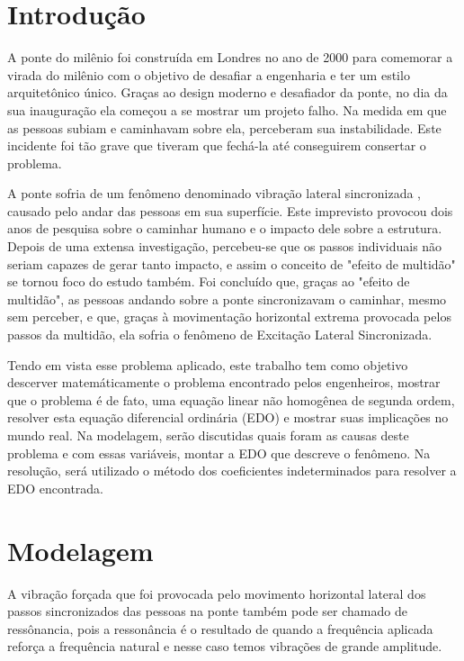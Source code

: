 \documentclass[12pt]{article}
\begin{document}
\section{Introdução}

A ponte do milênio foi construída em Londres no ano de 2000 para comemorar
a virada do milênio com o objetivo de desafiar a engenharia e ter um estilo arquitetônico único.
Graças ao design moderno e desafiador da ponte, no dia da sua inauguração ela começou a se mostrar um projeto falho.
Na medida em que as pessoas subiam e caminhavam sobre ela, perceberam sua instabilidade.
Este incidente foi tão grave que tiveram que fechá-la até conseguirem consertar o problema.

A ponte sofria de um fenômeno denominado vibração lateral sincronizada \cite{ponteMilenioPortugues20}, causado pelo andar das pessoas em sua superfície.
Este imprevisto provocou dois anos de pesquisa sobre o caminhar humano e o impacto dele sobre a estrutura. 
Depois de uma extensa investigação, percebeu-se que os passos individuais não seriam capazes de gerar tanto impacto, e assim
o conceito de "efeito de multidão" se tornou foco do estudo também. Foi concluído que, graças ao "efeito de multidão",
as pessoas andando sobre a ponte sincronizavam o caminhar, mesmo sem perceber, e que, graças à movimentação horizontal 
extrema provocada pelos passos da multidão, ela sofria o fenômeno de 
Excitação Lateral Sincronizada.

Tendo em vista esse problema aplicado, este trabalho tem como objetivo descerver matemáticamente
o problema encontrado pelos engenheiros, mostrar que o problema é de fato, uma equação linear não 
homogênea de segunda ordem, resolver esta equação
diferencial ordinária (EDO) e mostrar suas implicações no mundo real.
Na modelagem, serão discutidas quais foram as causas deste problema e com essas variáveis, montar a EDO que
descreve o fenômeno. Na resolução, será utilizado o método dos coeficientes indeterminados
para resolver a EDO encontrada. 

\pagebreak 
\section{Modelagem}

A vibração forçada que foi provocada pelo movimento horizontal lateral dos passos sincronizados das pessoas na ponte também pode ser 
chamado de ressônancia, pois a ressonância  é o resultado de quando a frequência aplicada reforça a frequência natural e nesse caso temos vibrações de grande amplitude.
\end{document}
